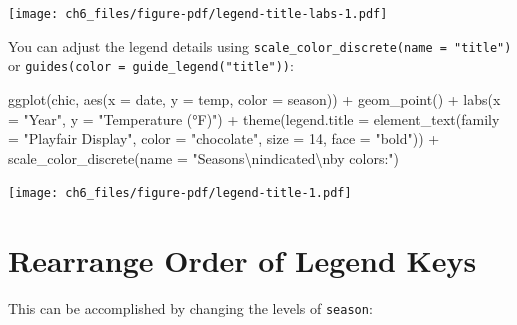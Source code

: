 \documentclass[
  letterpaper,
  DIV=11,
  numbers=noendperiod]{scrreprt}
\newenvironment{Shaded}{\begin{snugshade}}{\end{snugshade}}
\newcommand{\AttributeTok}[1]{\textcolor[rgb]{0.40,0.45,0.13}{#1}}
\newcommand{\DecValTok}[1]{\textcolor[rgb]{0.68,0.00,0.00}{#1}}
\newcommand{\FunctionTok}[1]{\textcolor[rgb]{0.28,0.35,0.67}{#1}}
\newcommand{\NormalTok}[1]{\textcolor[rgb]{0.00,0.23,0.31}{#1}}
\newcommand{\OtherTok}[1]{\textcolor[rgb]{0.00,0.23,0.31}{#1}}
\newcommand{\SpecialCharTok}[1]{\textcolor[rgb]{0.37,0.37,0.37}{#1}}
\newcommand{\StringTok}[1]{\textcolor[rgb]{0.13,0.47,0.30}{#1}}
\begin{document}
\texttt{[image: ch6\_files/figure-pdf/legend-title-labs-1.pdf]}

You can adjust the legend details using
\texttt{scale\_color\_discrete(name\ =\ "title")} or
\texttt{guides(color\ =\ guide\_legend("title"))}:

\begin{Shaded}
\begin{Highlighting}[]
\FunctionTok{ggplot}\NormalTok{(chic, }\FunctionTok{aes}\NormalTok{(}\AttributeTok{x =}\NormalTok{ date, }\AttributeTok{y =}\NormalTok{ temp, }\AttributeTok{color =}\NormalTok{ season)) }\SpecialCharTok{+}
  \FunctionTok{geom\_point}\NormalTok{() }\SpecialCharTok{+}
  \FunctionTok{labs}\NormalTok{(}\AttributeTok{x =} \StringTok{"Year"}\NormalTok{, }\AttributeTok{y =} \StringTok{"Temperature (°F)"}\NormalTok{) }\SpecialCharTok{+}
  \FunctionTok{theme}\NormalTok{(}\AttributeTok{legend.title =} \FunctionTok{element\_text}\NormalTok{(}\AttributeTok{family =} \StringTok{"Playfair Display"}\NormalTok{,}
                                    \AttributeTok{color =} \StringTok{"chocolate"}\NormalTok{,}
                                    \AttributeTok{size =} \DecValTok{14}\NormalTok{, }\AttributeTok{face =} \StringTok{"bold"}\NormalTok{)) }\SpecialCharTok{+}
  \FunctionTok{scale\_color\_discrete}\NormalTok{(}\AttributeTok{name =} \StringTok{"Seasons}\SpecialCharTok{\textbackslash{}n}\StringTok{indicated}\SpecialCharTok{\textbackslash{}n}\StringTok{by colors:"}\NormalTok{)}
\end{Highlighting}
\end{Shaded}

\texttt{[image: ch6\_files/figure-pdf/legend-title-1.pdf]}

\section{Rearrange Order of Legend
Keys}\label{rearrange-order-of-legend-keys}

This can be accomplished by changing the levels of \texttt{season}:

\begin{Shaded}
\end{Shaded}
\end{document}
